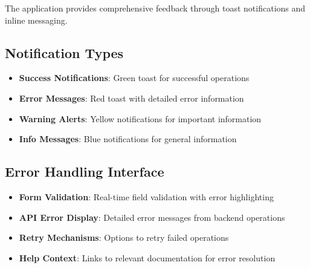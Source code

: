 The application provides comprehensive feedback through toast notifications and inline messaging.

\subsection{Notification Types}

\begin{itemize}
    \item \textbf{Success Notifications}: Green toast for successful operations
    \item \textbf{Error Messages}: Red toast with detailed error information
    \item \textbf{Warning Alerts}: Yellow notifications for important information
    \item \textbf{Info Messages}: Blue notifications for general information
\end{itemize}

\subsection{Error Handling Interface}

\begin{itemize}
    \item \textbf{Form Validation}: Real-time field validation with error highlighting
    \item \textbf{API Error Display}: Detailed error messages from backend operations
    \item \textbf{Retry Mechanisms}: Options to retry failed operations
    \item \textbf{Help Context}: Links to relevant documentation for error resolution
\end{itemize}

